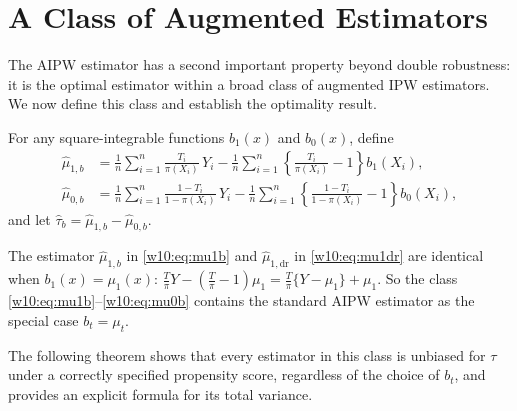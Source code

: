 \documentclass[master.tex]{subfiles}
\begin{document}
\section{A Class of Augmented Estimators}
\label{w10:sec:class}

The AIPW estimator has a second important property beyond double
robustness: it is the optimal estimator within a broad class of
augmented IPW estimators.  We now define this class and establish
the optimality result.

For any square-integrable functions $b_1(x)$ and $b_0(x)$, define
\begin{align}
  \hat\mu_{1,b}
  &= \frac{1}{n}\sum_{i=1}^n \frac{T_i}{\pi(X_i)}\,Y_i
     - \frac{1}{n}\sum_{i=1}^n
       \left\{\frac{T_i}{\pi(X_i)}-1\right\} b_1(X_i),
  \label{w10:eq:mu1b} \\[4pt]
  \hat\mu_{0,b}
  &= \frac{1}{n}\sum_{i=1}^n \frac{1-T_i}{1-\pi(X_i)}\,Y_i
     - \frac{1}{n}\sum_{i=1}^n
       \left\{\frac{1-T_i}{1-\pi(X_i)}-1\right\} b_0(X_i),
  \label{w10:eq:mu0b}
\end{align}
and let $\hat\tau_b = \hat\mu_{1,b} - \hat\mu_{0,b}$.

\begin{remark}
\label{w10:rem:equiv}
The estimator $\hat\mu_{1,b}$ in \eqref{w10:eq:mu1b} and
$\hat\mu_{1,\mathrm{dr}}$ in \eqref{w10:eq:mu1dr} are identical
when $b_1(x) = \mu_1(x)$:
$\frac{T}{\pi}Y - (\frac{T}{\pi}-1)\mu_1
 = \frac{T}{\pi}\{Y-\mu_1\}+\mu_1$.
So the class \eqref{w10:eq:mu1b}--\eqref{w10:eq:mu0b} contains the
standard AIPW estimator as the special case $b_t = \mu_t$.
\end{remark}

The following theorem shows that every estimator in this class is
unbiased for $\tau$ under a correctly specified propensity score,
regardless of the choice of $b_t$, and provides an explicit formula
for its total variance.
\end{document}
